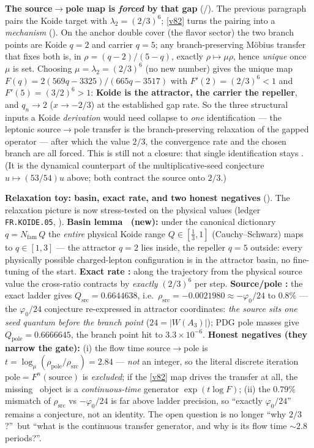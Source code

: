 \documentclass[11pt,a4paper]{article}
\newcommand{\Nfam}{N_{\mathrm{fam}}}
\begin{document}
\par\smallskip\noindent\textbf{The source$\to$pole map is \emph{forced} by that gap} (\mE/\mC).
The previous paragraph pairs the Koide target with $\lambda_2=(2/3)^6$; \vref{v82} turns the
pairing into a \emph{mechanism} (). On the anchor double cover (the flavor sector) the two branch points are Koide $q=2$ and carrier
$q=5$; any branch-preserving M\"obius transfer that fixes both is, in $\rho=(q-2)/(5-q)$, exactly $\rho\mapsto\mu\rho$,
hence \emph{unique} once $\mu$ is set. Choosing $\mu=\lambda_2=(2/3)^6$ (no new number) gives the unique map
$F(q)=2(569q-3325)/(665q-3517)$ with $F'(2)=(2/3)^6<1$ and $F'(5)=(3/2)^6>1$: \textbf{Koide is the attractor, the
carrier the repeller}, and $q_n\to2$ ($x\to-2/3$) at the established gap rate. So the three structural inputs a Koide
\emph{derivation} would need collapse to \emph{one} identification --- the leptonic source$\to$pole transfer is the
branch-preserving relaxation of the gapped operator --- after which the value $2/3$, the convergence rate and the
chosen branch are all forced. This is still not a closure: that single identification stays \mC. (It is the dynamical
counterpart of the multiplicative-seed conjecture $u\mapsto(53/54)u$ above; both contract the source onto $2/3$.)

\par\smallskip\noindent\textbf{Relaxation toy: basin, exact rate, and two honest negatives} (\mE).
The relaxation picture is now stress-tested on the physical values (ledger \texttt{FR.KOIDE.05}, ).
\textbf{Basin lemma \mE\ (new):} under the canonical dictionary $q=\Nfam\,Q$ the \emph{entire} physical Koide
range $Q\in[\tfrac13,1]$ (Cauchy--Schwarz) maps to $q\in[1,3]$ --- the attractor $q=2$ lies inside, the
repeller $q=5$ outside: every physically possible charged-lepton configuration is in the attractor basin, no
fine-tuning of the start. \textbf{Exact rate \mE:} along the trajectory from the physical source value the
cross-ratio contracts by \emph{exactly} $(2/3)^6$ per step. \textbf{Source/pole \mE:} the exact ladder
gives $Q_{\mathrm{src}}=0.6644638$, i.e.\ $\rho_{\mathrm{src}}=-0.0021980\approx-\varphi_0/24$ to $0.8\%$ ---
the $\varphi_0/24$ conjecture re-expressed in attractor coordinates: \emph{the source sits one seed quantum
before the branch point} ($24=|W(A_3)|$); PDG pole masses give $Q_{\mathrm{pole}}=0.6666645$, the branch
point hit to $3.3\times10^{-6}$. \textbf{Honest negatives (they narrow the gate):} (i) the flow time
source$\to$pole is $t=\log_\mu(\rho_{\mathrm{pole}}/\rho_{\mathrm{src}})=2.84$ --- \emph{not} an integer, so
the literal discrete iteration $\mathrm{pole}=F^n(\mathrm{source})$ is \emph{excluded}; if the \vref{v82} map drives
the transfer at all, the missing \mC\ object is a \emph{continuous-time} generator $\exp(t\log F)$;
(ii) the $0.79\%$ mismatch of $\rho_{\mathrm{src}}$ vs $-\varphi_0/24$ is far above ladder precision, so
``exactly $\varphi_0/24$'' remains a conjecture, not an identity. The open question is no longer ``why
$2/3$?''\ but ``what is the continuous transfer generator, and why is its flow time $\sim2.8$ periods?''.
\end{document}
